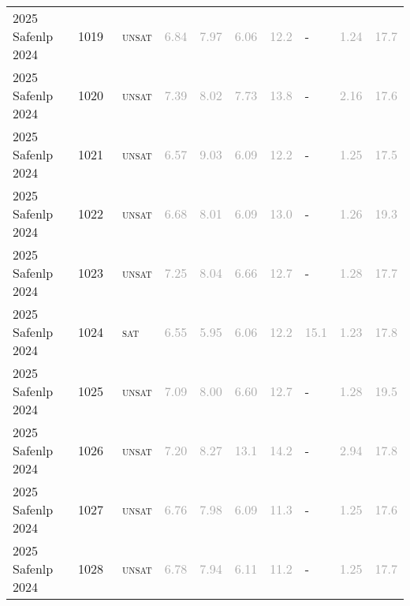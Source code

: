\begin{center}
{\begin{longtable}{@{}llllllllll@{}}
2025 Safenlp 2024 & 1019 & ~\textsc{unsat} & \textcolor{darkgray}{6.84} & \textcolor{darkgray}{7.97} & \textcolor{darkgray}{6.06} & \textcolor{darkgray}{12.2} & - & \textcolor{darkgray}{1.24} & \textcolor{darkgray}{17.7} \\
2025 Safenlp 2024 & 1020 & ~\textsc{unsat} & \textcolor{darkgray}{7.39} & \textcolor{darkgray}{8.02} & \textcolor{darkgray}{7.73} & \textcolor{darkgray}{13.8} & - & \textcolor{darkgray}{2.16} & \textcolor{darkgray}{17.6} \\
2025 Safenlp 2024 & 1021 & ~\textsc{unsat} & \textcolor{darkgray}{6.57} & \textcolor{darkgray}{9.03} & \textcolor{darkgray}{6.09} & \textcolor{darkgray}{12.2} & - & \textcolor{darkgray}{1.25} & \textcolor{darkgray}{17.5} \\
2025 Safenlp 2024 & 1022 & ~\textsc{unsat} & \textcolor{darkgray}{6.68} & \textcolor{darkgray}{8.01} & \textcolor{darkgray}{6.09} & \textcolor{darkgray}{13.0} & - & \textcolor{darkgray}{1.26} & \textcolor{darkgray}{19.3} \\
2025 Safenlp 2024 & 1023 & ~\textsc{unsat} & \textcolor{darkgray}{7.25} & \textcolor{darkgray}{8.04} & \textcolor{darkgray}{6.66} & \textcolor{darkgray}{12.7} & - & \textcolor{darkgray}{1.28} & \textcolor{darkgray}{17.7} \\
2025 Safenlp 2024 & 1024 & ~\textsc{sat} & \textcolor{darkgray}{6.55} & \textcolor{darkgray}{5.95} & \textcolor{darkgray}{6.06} & \textcolor{darkgray}{12.2} & \textcolor{darkgray}{15.1} & \textcolor{darkgray}{1.23} & \textcolor{darkgray}{17.8} \\
2025 Safenlp 2024 & 1025 & ~\textsc{unsat} & \textcolor{darkgray}{7.09} & \textcolor{darkgray}{8.00} & \textcolor{darkgray}{6.60} & \textcolor{darkgray}{12.7} & - & \textcolor{darkgray}{1.28} & \textcolor{darkgray}{19.5} \\
2025 Safenlp 2024 & 1026 & ~\textsc{unsat} & \textcolor{darkgray}{7.20} & \textcolor{darkgray}{8.27} & \textcolor{darkgray}{13.1} & \textcolor{darkgray}{14.2} & - & \textcolor{darkgray}{2.94} & \textcolor{darkgray}{17.8} \\
2025 Safenlp 2024 & 1027 & ~\textsc{unsat} & \textcolor{darkgray}{6.76} & \textcolor{darkgray}{7.98} & \textcolor{darkgray}{6.09} & \textcolor{darkgray}{11.3} & - & \textcolor{darkgray}{1.25} & \textcolor{darkgray}{17.6} \\
2025 Safenlp 2024 & 1028 & ~\textsc{unsat} & \textcolor{darkgray}{6.78} & \textcolor{darkgray}{7.94} & \textcolor{darkgray}{6.11} & \textcolor{darkgray}{11.2} & - & \textcolor{darkgray}{1.25} & \textcolor{darkgray}{17.7} \\

\end{longtable}}
\end{center}
